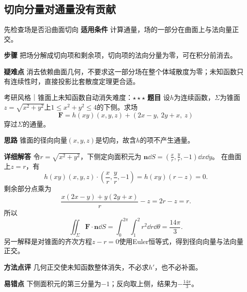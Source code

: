 \subsection{切向分量对通量没有贡献}\label{cf:tangent}
\begin{method}{先检查场是否沿曲面切向}
\textbf{适用条件} 计算通量，场的一部分在曲面上与法向量正交。\par
\textbf{步骤} 把场分解成切向项和剩余项，切向项的法向分量为零，可在积分前消去。\par
\textbf{疑难点} 消去依赖曲面几何，不要求这一部分场在整个体域散度为零；未知函数只有连续性时，直接投影比套散度定理更合适。
\end{method}
\begin{example}{考研风格｜锥面上未知函数自动消失}{难度：$\star\star\star$}
\label{cf:ex:tangent}
\textbf{题目} 设$h$为连续函数，$\Sigma$为锥面$z=\sqrt{x^2+y^2}$上$1\le x^2+y^2\le4$的下侧。求场
\[
\bm F=h(xy)(x,y,z)+(2x-y,\ 2y+x,\ z)
\]
穿过$\Sigma$的通量。\par
\textbf{思路} 锥面的径向向量$(x,y,z)$是切向，故含$h$的项不产生通量。\par
\textbf{详细解答} 令$r=\sqrt{x^2+y^2}$，下侧定向面积元为
$\bm n\dd S=(\frac{x}{r},\frac{y}{r},-1)\dd x\dd y$。
在曲面上$z=r$，有
\[
h(xy)(x,y,z)\cdot(\dfrac{x}{r},\dfrac{y}{r},-1)=h(xy)(r-z)=0.
\]
剩余部分点乘为
\[
\dfrac{x(2x-y)+y(2y+x)}r-z=2r-z=r.
\]
所以
\[
\iint_\Sigma\bm F\cdot\bm n\dd S
=\int_0^{2\pi}\int_1^2r^2\dd r\dd\theta
=\dfrac{14\pi}{3}.
\]
另一解释是对锥面的齐次方程$z-r=0$使用Euler恒等式，得到径向向量与法向量正交。\par
\textbf{方法点评} 几何正交使未知函数整体消失，不必求$h'$，也不必补面。\par
\textbf{易错点} 下侧面积元的第三分量为$-1$；反向取上侧，结果为$-\frac{14\pi}{3}$。
\end{example}

